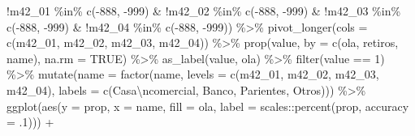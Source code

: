 \documentclass[
  12pt,
]{book}
\newenvironment{Shaded}{\begin{snugshade}}{\end{snugshade}}
\newcommand{\AttributeTok}[1]{\textcolor[rgb]{0.77,0.63,0.00}{#1}}
\newcommand{\ConstantTok}[1]{\textcolor[rgb]{0.00,0.00,0.00}{#1}}
\newcommand{\DecValTok}[1]{\textcolor[rgb]{0.00,0.00,0.81}{#1}}
\newcommand{\FunctionTok}[1]{\textcolor[rgb]{0.00,0.00,0.00}{#1}}
\newcommand{\NormalTok}[1]{#1}
\newcommand{\SpecialCharTok}[1]{\textcolor[rgb]{0.00,0.00,0.00}{#1}}
\newcommand{\StringTok}[1]{\textcolor[rgb]{0.31,0.60,0.02}{#1}}
\begin{document}
\begin{Shaded}
\begin{Highlighting}[]
           \SpecialCharTok{!}\NormalTok{m42\_01 }\SpecialCharTok{\%in\%} \FunctionTok{c}\NormalTok{(}\SpecialCharTok{{-}}\DecValTok{888}\NormalTok{, }\SpecialCharTok{{-}}\DecValTok{999}\NormalTok{) }\SpecialCharTok{\&} \SpecialCharTok{!}\NormalTok{m42\_02 }\SpecialCharTok{\%in\%} \FunctionTok{c}\NormalTok{(}\SpecialCharTok{{-}}\DecValTok{888}\NormalTok{, }\SpecialCharTok{{-}}\DecValTok{999}\NormalTok{) }\SpecialCharTok{\&} 
           \SpecialCharTok{!}\NormalTok{m42\_03 }\SpecialCharTok{\%in\%} \FunctionTok{c}\NormalTok{(}\SpecialCharTok{{-}}\DecValTok{888}\NormalTok{, }\SpecialCharTok{{-}}\DecValTok{999}\NormalTok{) }\SpecialCharTok{\&} \SpecialCharTok{!}\NormalTok{m42\_04 }\SpecialCharTok{\%in\%} \FunctionTok{c}\NormalTok{(}\SpecialCharTok{{-}}\DecValTok{888}\NormalTok{, }\SpecialCharTok{{-}}\DecValTok{999}\NormalTok{)) }\SpecialCharTok{\%\textgreater{}\%} 
  \FunctionTok{pivot\_longer}\NormalTok{(}\AttributeTok{cols =} \FunctionTok{c}\NormalTok{(m42\_01, m42\_02, m42\_03, m42\_04)) }\SpecialCharTok{\%\textgreater{}\%} 
  \FunctionTok{prop}\NormalTok{(value, }\AttributeTok{by =} \FunctionTok{c}\NormalTok{(ola, retiros, name), }\AttributeTok{na.rm =} \ConstantTok{TRUE}\NormalTok{) }\SpecialCharTok{\%\textgreater{}\%} 
  \FunctionTok{as\_label}\NormalTok{(value, ola) }\SpecialCharTok{\%\textgreater{}\%} 
  \FunctionTok{filter}\NormalTok{(value }\SpecialCharTok{==} \DecValTok{1}\NormalTok{) }\SpecialCharTok{\%\textgreater{}\%} 
  \FunctionTok{mutate}\NormalTok{(}\AttributeTok{name =} \FunctionTok{factor}\NormalTok{(name, }
                       \AttributeTok{levels =} \FunctionTok{c}\NormalTok{(}\StringTok{\textquotesingle{}m42\_01\textquotesingle{}}\NormalTok{, }\StringTok{\textquotesingle{}m42\_02\textquotesingle{}}\NormalTok{, }\StringTok{\textquotesingle{}m42\_03\textquotesingle{}}\NormalTok{, }\StringTok{\textquotesingle{}m42\_04\textquotesingle{}}\NormalTok{),}
                       \AttributeTok{labels =} \FunctionTok{c}\NormalTok{(}\StringTok{\textquotesingle{}Casa}\SpecialCharTok{\textbackslash{}n}\StringTok{comercial\textquotesingle{}}\NormalTok{, }\StringTok{\textquotesingle{}Banco\textquotesingle{}}\NormalTok{, }
                                  \StringTok{\textquotesingle{}Parientes\textquotesingle{}}\NormalTok{, }\StringTok{\textquotesingle{}Otros\textquotesingle{}}\NormalTok{))) }\SpecialCharTok{\%\textgreater{}\%} 
  \FunctionTok{ggplot}\NormalTok{(}\FunctionTok{aes}\NormalTok{(}\AttributeTok{y =}\NormalTok{ prop, }\AttributeTok{x =}\NormalTok{ name, }\AttributeTok{fill =}\NormalTok{ ola, }
             \AttributeTok{label =}\NormalTok{ scales}\SpecialCharTok{::}\FunctionTok{percent}\NormalTok{(prop, }\AttributeTok{accuracy =}\NormalTok{ .}\DecValTok{1}\NormalTok{))) }\SpecialCharTok{+}

\end{Highlighting}
\end{Shaded}
\end{document}
